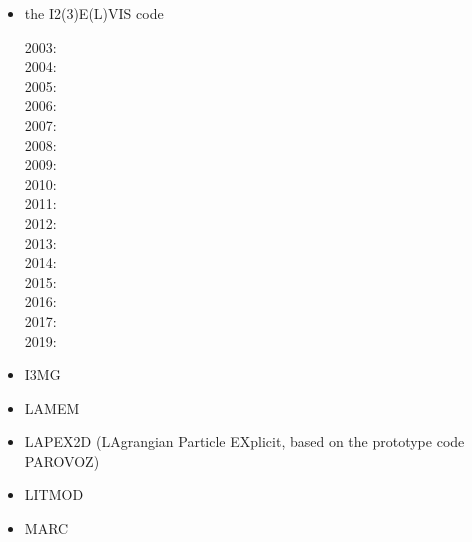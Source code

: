 \begin{itemize}
\item the I2(3)E(L)VIS code

2003: \cite{geyu03}\cite{geyu03b}\cite{geur03}\\
2004: \cite{geym04}\cite{geys04}\cite{gepm04}\\
2005: \cite{buge05}\\
2006: \cite{bbeg06}\cite{gest06}\cite{gogc06}\cite{gecy06}\\
2007: \cite{geyu07}\cite{gogc07}\\
2008: \cite{scbe08}\cite{gecy08}\cite{uegs08}\cite{fagc08}\cite{zhgy09}\\
2009: \cite{gefc09}\\
2010: \cite{gerya2010}\cite{nigm10}\\
2011: \cite{dugm11}\cite{dumg11}\cite{lixg11}\cite{gery11}\cite{geme11}\\
2012: \cite{crsg12}\cite{dugk12}\cite{lixg12}\cite{fagm12}\\
2013: \cite{lixg13}\cite{nabg13}\cite{magc13}\cite{vagd13a}\cite{vagd13b}\cite{zhgt13}\cite{dyge13}\cite{gemd13}\cite{mana13}\\
2014: \cite{dugs14}\cite{puge14}\cite{rugb14}\cite{voge14b}\cite{bagb14}\cite{lige14}\cite{stjm14}\cite{malg14}
\cite{buge14}\cite{gosk14}\cite{bagb14}\cite{vamd14}\\
2015: \cite{duay15}\cite{uewg15}\cite{rula15}\cite{gesb15}\cite{rula15}\\
2016: \cite{kobc16}\cite{magc16}\cite{fige16}\cite{mauw16}\\
2017: \cite{mauw17}\\
2019: \cite{kobg19}\cite{ligc19}

\item I3MG
\cite{facc14}

\item LAMEM
\cite{scbe08}
\cite{kamm10}
\cite{lemk11}
\cite{may12}
\cite{lesh14}
\cite{cokm14}
\cite{bakp14}
\cite{feka14a}
\cite{feka14b}
\cite{puka15}
\cite{feka15}
\cite{cofk15}
\cite{kapb16}

\item LAPEX2D (LAgrangian Particle EXplicit, based on the prototype code PAROVOZ) 
\cite{sopg05}
\cite{bbeg06}\cite{basv06}
\cite{baso08}
\cite{scbe08}
\cite{sosk11}


\item LITMOD
\cite{afrf07}
\cite{affr08}
\cite{fuac09}
\cite{fufa10}


\item MARC
\cite{nesg97}
\cite{nesb99}



\end{itemize}
